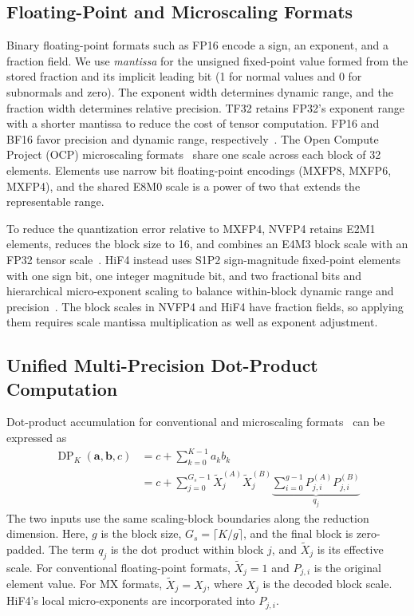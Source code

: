 \documentclass[conference,10pt,letterpaper]{IEEEtran}
\begin{document}
\subsection{Floating-Point and Microscaling Formats}
\label{sec:formats}

Binary floating-point formats such as FP16 encode a sign, an exponent, and a fraction field. We use \emph{mantissa} for the unsigned fixed-point value formed from the stored fraction and its implicit leading bit (1 for normal values and 0 for subnormals and zero). The exponent width determines dynamic range, and the fraction width determines relative precision. TF32 retains FP32's exponent range with a shorter mantissa to reduce the cost of tensor computation. FP16 and BF16 favor precision and dynamic range, respectively~\cite{burgess2019bfloat16}. The Open Compute Project (OCP) microscaling formats~\cite{ocpmx2023} share one scale across each block of 32 elements. Elements use narrow bit floating-point encodings (MXFP8, MXFP6, MXFP4), and the shared E8M0 scale is a power of two that extends the representable range. 

To reduce the quantization error relative to MXFP4, NVFP4 retains E2M1 elements, reduces the block size to 16, and combines an E4M3 block scale with an FP32 tensor scale~\cite{nvidia2024nvfp4}. HiF4 instead uses S1P2 sign-magnitude fixed-point elements with one sign bit, one integer magnitude bit, and two fractional bits and hierarchical micro-exponent scaling to balance within-block dynamic range and precision~\cite{hifloat4}. The block scales in NVFP4 and HiF4 have fraction fields, so applying them requires scale mantissa multiplication as well as exponent adjustment.

\subsection{Unified Multi-Precision Dot-Product Computation}
\label{sec:tensor_organization}

Dot-product accumulation for conventional and microscaling formats~\cite{ocpmx2023} can be expressed as
\begin{equation}
\begin{aligned}
\operatorname{DP}_K(\mathbf{a},\mathbf{b},c)
&=c+\sum_{k=0}^{K-1}a_kb_k \\
&=c+\sum_{j=0}^{G_s-1}
\widetilde{X}_j^{(A)}\widetilde{X}_j^{(B)}
\underbrace{\sum_{i=0}^{g-1}
P_{j,i}^{(A)}P_{j,i}^{(B)}}_{q_j}
\end{aligned}
\label{eq:blockdot}
\end{equation}
The two inputs use the same scaling-block boundaries along the reduction dimension. Here, $g$ is the block size, $G_s=\lceil K/g\rceil$, and the final block is zero-padded. The term $q_j$ is the dot product within block $j$, and $\widetilde{X}_j$ is its effective scale. For conventional floating-point formats, $\widetilde{X}_j=1$ and $P_{j,i}$ is the original element value. For MX formats, $\widetilde{X}_j=X_j$, where $X_j$ is the decoded block scale. HiF4's local micro-exponents are incorporated into $P_{j,i}$.
\end{document}

